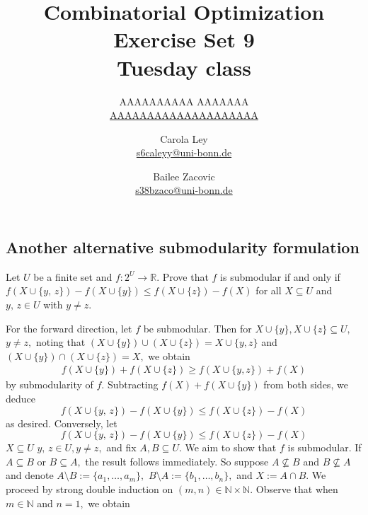 \documentclass{article}
\title{Combinatorial Optimization \\ Exercise Set 9 \\ Tuesday class}
\author{
  AAAAAAAAAA AAAAAAA \\
  \href{mailto:AAAAAAAAAAAAAAAAAAAA}{AAAAAAAAAAAAAAAAAAAA}
  \and
  Carola Ley \\
  \href{mailto:s6caleyy@uni-bonn.de}{s6caleyy@uni-bonn.de}
  \and
  Bailee Zacovic \\
  \href{mailto:s38bzaco@uni-bonn.de}{s38bzaco@uni-bonn.de}
}
\newcommand{\N}{\mathbb{N}}
\newcommand{\R}{\mathbb{R}}
\begin{document}
  \maketitle

  \setcounter{section}{9}
  \subsection{Another alternative submodularity formulation}
  \begin{centerframebox}
    Let $U$ be a finite set and $f : 2^U \to \R$. Prove that $f$ is submodular
    if and only if $f(X \cup \{y,\, z\}) - f(X \cup \{y\}) \leq f(X \cup \{z\}) - f(X)$ for all $X \subseteq U$ and
    $y,\, z \in U$ with $y \neq z$.
  \end{centerframebox}
  For the forward direction, let $f$ be submodular. Then for $X\cup \{y\},X\cup \{z\}\subseteq U,$ $y\neq z,$ noting that $(X\cup \{y\})\cup (X\cup \{z\})=X\cup \{y,z\}$ and $(X\cup \{y\})\cap (X\cup \{z\})=X,$ we obtain
  \begin{align*}
      f(X\cup \{y\})+f(X\cup \{z\})\geq f(X\cup \{y,z\})+f(X)
  \end{align*}
  by submodularity of $f$. Subtracting $f(X)+f(X\cup \{y\})$ from both sides, we deduce
  $$f(X \cup \{y,\, z\}) - f(X \cup \{y\}) \leq f(X \cup \{z\}) - f(X)$$as desired. Conversely, let
  \begin{equation}f(X \cup \{y,\, z\}) - f(X \cup \{y\}) \leq f(X \cup \{z\}) - f(X)\end{equation} $X \subseteq U$     $y,\, z \in U, y \neq z,$ and fix $A,B\subseteq U$. We aim to show that $f$ is submodular. If $A\subseteq B$ or $B\subseteq A,$ the result follows immediately. So suppose $A \not\subseteq B$ and $ B \not\subseteq A$ and denote $A\setminus B:=\{a_1,\dots,a_m\},$ $B\setminus A:=\{b_1,\dots,b_n\},$ and $X:=A\cap B.$ We proceed by strong double induction on $(m,n)\in \mathbb{N}\times \N.$ Observe that when $m\in \mathbb{N}$ and $n=1,$ we obtain
\end{document}
